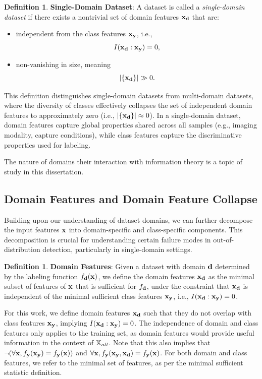 \documentclass[11pt, oneside]{book}
\theoremstyle{plain}
\theoremstyle{definition}
\newtheorem{definition}[theorem]{Definition}
\theoremstyle{remark}
\begin{document}
\begin{definition}
\textbf{Single-Domain Dataset}:  
A dataset is called a \emph{single-domain dataset} if there exists a nontrivial set of domain features \( {\mathbf{x}}_{{\mathbf{d}}} \) that are:
\begin{itemize}
    \item independent from the class features \( {\mathbf{x}}_{{\mathbf{y}}} \), i.e., 
    \[
    I({\mathbf{x}}_{{\mathbf{d}}} : {\mathbf{x}}_{{\mathbf{y}}}) = 0,
    \]
    \item non-vanishing in size, meaning 
    \[
    |\{{\mathbf{x}}_{{\mathbf{d}}}\}| \gg 0.
    \]
\end{itemize}
This definition distinguishes single-domain datasets from multi-domain datasets, where the diversity of classes effectively collapses the set of independent domain features to approximately zero (i.e., \( |\{{\mathbf{x}}_{{\mathbf{d}}}\}| \approx 0 \)). In a single-domain dataset, domain features capture global properties shared across all samples (e.g., imaging modality, capture conditions), while class features capture the discriminative properties used for labeling.
\label{def:singledomain}
\end{definition}

The nature of domains their interaction with information theory is a topic of study in this dissertation.

\subsection{Domain Features and Domain Feature Collapse}

Building upon our understanding of dataset domains, we can further decompose the input features ${\mathbf{x}}$ into domain-specific and class-specific components. This decomposition is crucial for understanding certain failure modes in out-of-distribution detection, particularly in single-domain settings.

\begin{definition}
\textbf{Domain Features}: Given a dataset with domain ${\mathbf{d}}$ determined by the labeling function $f_{{\mathbf{d}}}({\mathbf{x}})$, we define the domain features ${\mathbf{x}}_{\mathbf{d}}$ as the minimal subset of features of ${\mathbf{x}}$ that is sufficient for $f_{{\mathbf{d}}}$, under the constraint that ${\mathbf{x}}_{\mathbf{d}}$ is independent of the minimal sufficient class features ${\mathbf{x}}_{\mathbf{y}}$, i.e., $I({\mathbf{x}}_{\mathbf{d}} : {\mathbf{x}}_{\mathbf{y}}) = 0$.
\label{def:domainfeatures}
\end{definition}

For this work, we define domain features ${\mathbf{x}}_{\mathbf{d}}$ such that they do not overlap with class features ${\mathbf{x}}_{\mathbf{y}}$, implying $I({\mathbf{x}}_{\mathbf{d}}:{\mathbf{x}}_{\mathbf{y}}) = 0$. The independence of domain and class features only applies to the training set, as domain features would provide useful information in the context of ${\mathbb{X}}_{all}$. Note that this also implies that $\neg(\forall{\mathbf{x}},  f_{\mathbf{y}}({\mathbf{x}}_{\mathbf{y}}) = f_{\mathbf{y}}({\mathbf{x}}))$ and $\forall{\mathbf{x}}, f_{\mathbf{y}}({\mathbf{x}}_{\mathbf{y}}, {\mathbf{x}}_{\mathbf{d}}) = f_{\mathbf{y}}({\mathbf{x}})$. For both domain and class features, we refer to the minimal set of features, as per the minimal sufficient statistic definition.
\end{document}
